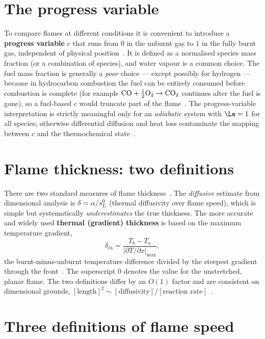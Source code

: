 \section{The progress variable}

To compare flames at different conditions it is convenient to introduce a \textbf{progress variable} $c$ that runs from $0$ in the unburnt gas to $1$ in the fully burnt gas, independent of physical position~\cite{transcript_l9}. It is defined as a normalised species mass fraction (or a combination of species), and water vapour is a common choice. The fuel mass fraction is generally a \emph{poor} choice --- except possibly for hydrogen --- because in hydrocarbon combustion the fuel can be entirely consumed before combustion is complete (for example $\mathrm{CO}+\tfrac12\mathrm{O_2}\rightarrow\mathrm{CO_2}$ continues after the fuel is gone), so a fuel-based $c$ would truncate part of the flame~\cite{transcript_l9}. The progress-variable interpretation is strictly meaningful only for an \emph{adiabatic} system with $\Le=1$ for all species; otherwise differential diffusion and heat loss contaminate the mapping between $c$ and the thermochemical state~\cite{transcript_l9}.

\section{Flame thickness: two definitions}

There are two standard measures of flame thickness~\cite{transcript_l9}. The \emph{diffusive} estimate from dimensional analysis is $\delta=\alpha/s_L^{0}$ (thermal diffusivity over flame speed), which is simple but systematically \emph{underestimates} the true thickness. The more accurate and widely used \textbf{thermal (gradient) thickness} is based on the maximum temperature gradient,
\begin{equation}
\delta_{th}=\frac{T_b-T_u}{\left|\partial T/\partial x\right|_{\max}},
\label{eq:thermal-thickness}
\end{equation}
the burnt-minus-unburnt temperature difference divided by the steepest gradient through the front~\cite{lecture8,lecture9}. The superscript $0$ denotes the value for the unstretched, planar flame. The two definitions differ by an $O(1)$ factor and are consistent on dimensional grounds, $[\text{length}]^2\sim[\text{diffusivity}]/[\text{reaction rate}]$~\cite{transcript_l9}.

\section{Three definitions of flame speed}


